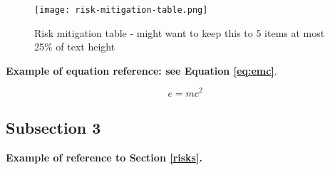 \begin{figure}[ht]
\centering\texttt{[image: risk-mitigation-table.png]}
\caption{Risk mitigation table - might want to keep this to 5 items at most ~ 25\% of text height}
\label{fig:example}
\end{figure}

\textbf{Example of equation reference: see Equation \eqref{eq:emc}}. 
\lipsum[6]

\begin{equation} 
\label{eq:emc}
e = mc^2
\end{equation}

\subsection{Subsection 3}

\textbf{Example of reference to Section \ref{risks}.} 
\lipsum[7]
\lipsum[8]